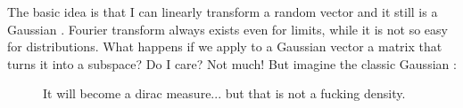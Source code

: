 \documentclass{report}
\begin{document}
The basic idea is that I can linearly transform a random vector and it still is a Gaussian \rv. Fourier transform always exists even for limits, while it is not so easy for distributions. What happens if we apply to a Gaussian vector a matrix that turns it into a subspace? Do I care? Not much! But imagine the classic Gaussian \rv:
\begin{figure}[h]
	\centering
	\label{fig:gaugau}
	\caption{It will become a dirac measure... but that is not a fucking density.}
\end{figure}
\clearpage
\listoffigures  
\end{document}
